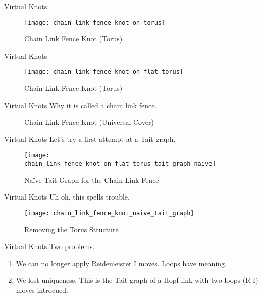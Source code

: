 \documentclass{beamer}
\begin{document}
    \begin{frame}{Virtual Knots}
        \begin{figure}
            \centering
            \texttt{[image: chain\_link\_fence\_knot\_on\_torus]}
            \caption{Chain Link Fence Knot (Torus)}
        \end{figure}
    \end{frame}
    \begin{frame}{Virtual Knots}
        \begin{figure}
            \centering
            \texttt{[image: chain\_link\_fence\_knot\_on\_flat\_torus]}
            \caption{Chain Link Fence Knot (Torus)}
        \end{figure}
    \end{frame}
    \begin{frame}{Virtual Knots}
        Why it is called a chain link fence.
        \begin{figure}
            \centering
            \caption{Chain Link Fence Knot (Universal Cover)}
        \end{figure}
    \end{frame}
    \begin{frame}{Virtual Knots}
        Let's try a first attempt at a Tait graph.
        \begin{figure}
            \centering
            \texttt{[image: chain\_link\_fence\_knot\_on\_flat\_torus\_tait\_graph\_naive]}
            \caption{Na\"{i}ve Tait Graph for the Chain Link Fence}
        \end{figure}
    \end{frame}
    \begin{frame}{Virtual Knots}
        Uh oh, this spells trouble.
        \begin{figure}
            \centering
            \texttt{[image: chain\_link\_fence\_knot\_naive\_tait\_graph]}
            \caption{Removing the Torus Structure}
        \end{figure}
    \end{frame}
    \begin{frame}{Virtual Knots}
        Two problems.
        \begin{enumerate}
            \item
                We can no longer apply Reidemeister I moves. Loops have meaning.
            \item
                We lost uniqueness. This is the Tait graph of a Hopf link with
                two loops (R I) moves introcued.
        \end{enumerate}
    \end{frame}
\end{document}
